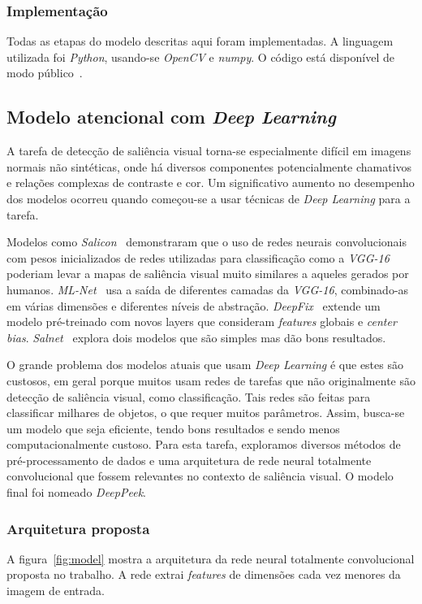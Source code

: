 \documentclass[11pt]{article}
\newcommand{\tit}[1]{\textit{#1}}
\begin{document}
\subsubsection{Implementação}
Todas as etapas do modelo descritas aqui foram implementadas.
A linguagem utilizada foi \tit{Python}, usando-se \tit{OpenCV} e \tit{numpy}.
O código está disponível de modo público~\cite{att}.

\subsection{Modelo atencional com \tit{Deep Learning}}
A tarefa de detecção de saliência visual torna-se especialmente difícil em
imagens normais não sintéticas, onde há diversos componentes potencialmente
chamativos e relações complexas de contraste e cor.
Um significativo aumento no desempenho dos modelos ocorreu quando começou-se
a usar técnicas de \tit{Deep Learning} para a tarefa.

Modelos como \emph{Salicon}~\cite{jiang_2015} demonstraram que o uso de redes
neurais convolucionais com
pesos inicializados de redes utilizadas para classificação como a
\emph{VGG-16}~\cite{zisserman_2014}
poderiam levar a mapas de saliência visual muito similares a aqueles
gerados por humanos.
\emph{ML-Net}~\cite{cornia_2016} usa a saída de diferentes camadas da
\emph{VGG-16}, combinado-as em várias dimensões e diferentes níveis de
abstração.
\emph{DeepFix}~\cite{kruthiventi_2015} extende um modelo pré-treinado com
novos layers que consideram \tit{features} globais e \tit{center bias}.
\emph{Salnet}~\cite{pan_2016} explora dois modelos que são simples mas
dão bons resultados.

O grande problema dos modelos atuais que usam \tit{Deep Learning} é que estes
são custosos, em geral porque muitos usam redes de tarefas que não
originalmente são detecção de saliência visual, como classificação.
Tais redes são feitas para classificar milhares de objetos, o que requer
muitos parâmetros. Assim, busca-se um modelo que seja eficiente,
tendo bons resultados e sendo menos computacionalmente custoso.
Para esta tarefa, exploramos diversos métodos de pré-processamento de dados
e uma arquitetura de rede neural totalmente convolucional que fossem relevantes
no contexto de saliência visual.
O modelo final foi nomeado \tit{DeepPeek}.

\subsubsection{Arquitetura proposta}
A figura~\ref{fig:model} mostra a arquitetura da rede neural totalmente
convolucional proposta no trabalho.
A rede extrai \tit{features} de dimensões cada vez menores da imagem de
entrada.
\end{document}
